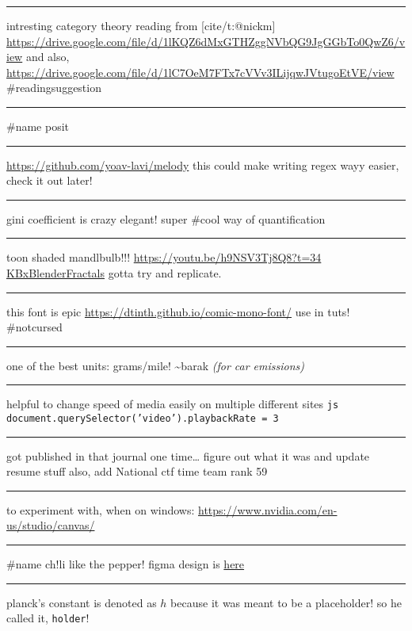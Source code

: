 \documentclass[letterpaper]{article}
\begin{document}
\noindent\rule{\textwidth}{0.5pt}

intresting category theory reading from [cite/t:@nickm]
\url{https://drive.google.com/file/d/1lKQZ6dMxGTHZggNVbQG9JgGGbTo0QwZ6/view}
and also,
\url{https://drive.google.com/file/d/1lC7OeM7FTx7cVVv3ILijqwJVtugoEtVE/view}
\#readingsuggestion

\noindent\rule{\textwidth}{0.5pt}

\#name posit

\noindent\rule{\textwidth}{0.5pt}

\url{https://github.com/yoav-lavi/melody} this could make writing regex wayy
easier, check it out later!

\noindent\rule{\textwidth}{0.5pt}

gini coefficient is crazy elegant! super \#cool way of quantification

\noindent\rule{\textwidth}{0.5pt}

toon shaded mandlbulb!!! \url{https://youtu.be/h9NSV3Tj8Q8?t=34}
\href{KBxBlenderFractals.org}{KBxBlenderFractals} gotta try and
replicate.

\noindent\rule{\textwidth}{0.5pt}

this font is epic \url{https://dtinth.github.io/comic-mono-font/} use in tuts!
\#notcursed

\noindent\rule{\textwidth}{0.5pt}

one of the best units: grams/mile! \textasciitilde{}barak \emph{(for car emissions)}

\noindent\rule{\textwidth}{0.5pt}

helpful to change speed of media easily on multiple different sites
\texttt{js document.querySelector('video').playbackRate = 3}

\noindent\rule{\textwidth}{0.5pt}

got published in that journal one time\ldots{} figure out what it was and
update resume stuff also, add National ctf time team rank 59

\noindent\rule{\textwidth}{0.5pt}

to experiment with, when on windows:
\url{https://www.nvidia.com/en-us/studio/canvas/}

\noindent\rule{\textwidth}{0.5pt}

\#name ch!li like the pepper! figma design is
\href{https://www.figma.com/file/Z3qcCiUBVYOY8MZwlc6yS1/ch!li?node-id=0\%3A1}{here}

\noindent\rule{\textwidth}{0.5pt}

planck's constant is denoted as \(h\) because it was meant to be a
placeholder! so he called it, \texttt{holder}!
\end{document}
